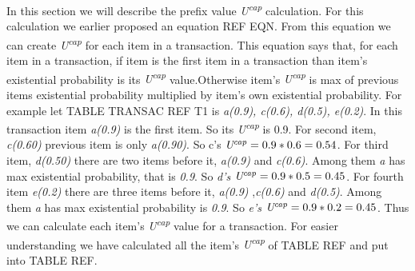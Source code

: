%


In this section we will describe the prefix value \emph{U\textsuperscript{cap}} calculation. For this calculation we earlier proposed an equation REF EQN. From this equation we can create \emph{U\textsuperscript{cap}} for each item in a transaction. This equation says that, for each item in a transaction, if item is the first item in a transaction than item's existential probability is its \emph{U\textsuperscript{cap}}  value.Otherwise item's \emph{U\textsuperscript{cap}} is max of previous items existential probability multiplied by item's  own existential probability. 
For example let TABLE TRANSAC REF T1 is \emph{a(0.9), c(0.6), d(0.5), e(0.2)}. 
In this transaction item \emph{a(0.9)} is the first item. So its \emph{U\textsuperscript{cap}} is 0.9. 
For second item, \emph{c(0.60)} previous item is only \emph{a(0.90)}. So c's $\emph{U\textsuperscript{cap}} = 0.9*0.6 = 0.54$. 
For third item, \emph{d(0.50)} there are two items before it, \emph{a(0.9)} and \emph{c(0.6)}. Among them \emph{a} has max existential probability, that is \emph{0.9}. So \emph{d's } $\emph{U\textsuperscript{cap}} = 0.9*0.5 = 0.45$. 
For fourth item \emph{e(0.2)} there are three items before it, \emph{a(0.9)} ,\emph{c(0.6)} and \emph{d(0.5)}. Among them \emph{a} has max existential probability is \emph{0.9}. So \emph{e's}  $\emph{U\textsuperscript{cap}} = 0.9*0.2 = 0.45$. Thus we can calculate each item's \emph{U\textsuperscript{cap}} value for a transaction. For easier understanding we have calculated all the item's \emph{U\textsuperscript{cap}} of TABLE REF and put into TABLE REF.
%